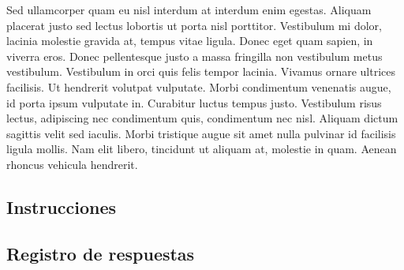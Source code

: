 Sed ullamcorper quam eu nisl interdum at interdum enim egestas. Aliquam placerat justo sed lectus lobortis ut porta nisl porttitor. Vestibulum mi dolor, lacinia molestie gravida at, tempus vitae ligula. Donec eget quam sapien, in viverra eros. Donec pellentesque justo a massa fringilla non vestibulum metus vestibulum. Vestibulum in orci quis felis tempor lacinia. Vivamus ornare ultrices facilisis. Ut hendrerit volutpat vulputate. Morbi condimentum venenatis augue, id porta ipsum vulputate in. Curabitur luctus tempus justo. Vestibulum risus lectus, adipiscing nec condimentum quis, condimentum nec nisl. Aliquam dictum sagittis velit sed iaculis. Morbi tristique augue sit amet nulla pulvinar id facilisis ligula mollis. Nam elit libero, tincidunt ut aliquam at, molestie in quam. Aenean rhoncus vehicula hendrerit.

\subsection{Instrucciones}

\subsection{Registro de respuestas}